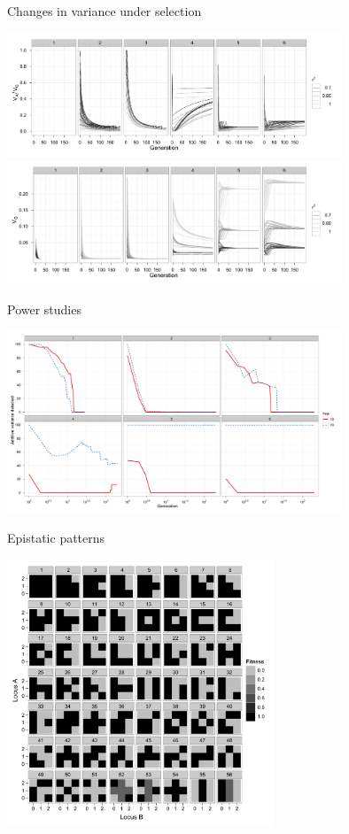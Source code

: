 \documentclass{beamer}
\begin{document}
\begin{frame}{Changes in variance under selection}
\begin{center}
\includegraphics[width=10cm]{propadditive_det_grey.pdf} \\
\includegraphics[width=10cm]{Vg_det_grey.pdf}
\end{center}
\end{frame}

\begin{frame}{Power studies}
\begin{center}
\includegraphics[width=10cm]{powersimple.pdf} \\
\end{center}
\end{frame}

\begin{frame}{Epistatic patterns}
\begin{center}
\includegraphics[width=8cm]{sup_gpmaps.pdf}
\end{center}
\end{frame}
\end{document}
